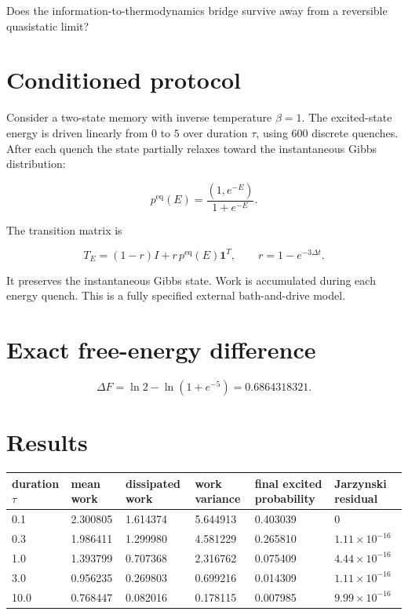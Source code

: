 \documentclass[11pt,a4paper,openany]{report}
\begin{document}
Does the information-to-thermodynamics bridge survive away from a reversible quasistatic limit?

\section{Conditioned protocol}

Consider a two-state memory with inverse temperature \(\beta=1\). The excited-state energy is driven linearly from \(0\) to \(5\) over duration \(\tau\), using 600 discrete quenches. After each quench the state partially relaxes toward the instantaneous Gibbs distribution:

\[
p^{\mathrm{eq}}(E)
=
\frac{(1,e^{-E})}{1+e^{-E}}.
\]

The transition matrix is

\[
T_E
=
(1-r)I+r\,p^{\mathrm{eq}}(E)\mathbf1^T,
\qquad
r=1-e^{-3\Delta t}.
\]

It preserves the instantaneous Gibbs state. Work is accumulated during each energy quench. This is a fully specified external bath-and-drive model.

\section{Exact free-energy difference}

\[
\Delta F
=
\ln2-\ln(1+e^{-5})
=
0.6864318321.
\]

\section{Results}

\begin{center}
\begingroup\footnotesize
\setlength{\tabcolsep}{3.5pt}
\renewcommand{\arraystretch}{1.16}
\begin{longtable}{@{}p{}p{}p{}p{}p{}p{}@{}}
\toprule
\textbf{duration \(\tau\)} & \textbf{mean work} & \textbf{dissipated work} & \textbf{work variance} & \textbf{final excited probability} & \textbf{Jarzynski residual} \\
\midrule
\endhead
0.1 & 2.300805 & 1.614374 & 5.644913 & 0.403039 & \(0\) \\
0.3 & 1.986411 & 1.299980 & 4.581229 & 0.265810 & \(1.11\times10^{-16}\) \\
1.0 & 1.393799 & 0.707368 & 2.316762 & 0.075409 & \(4.44\times10^{-16}\) \\
3.0 & 0.956235 & 0.269803 & 0.699216 & 0.014309 & \(1.11\times10^{-16}\) \\
10.0 & 0.768447 & 0.082016 & 0.178115 & 0.007985 & \(9.99\times10^{-16}\) \\
\bottomrule
\end{longtable}
\endgroup
\end{center}
\end{document}
